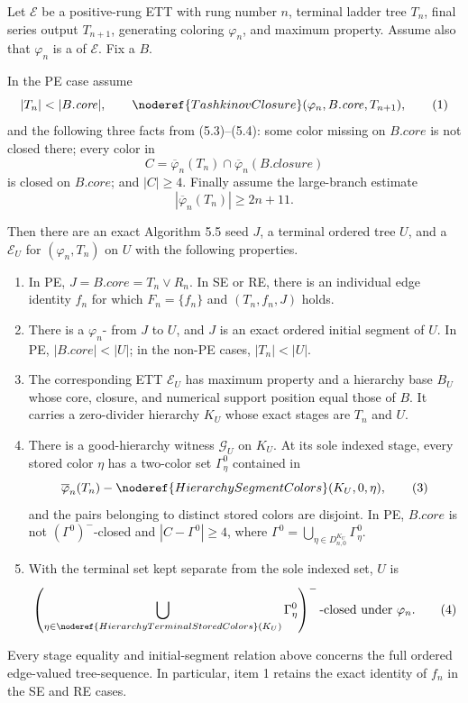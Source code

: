 \begin{theorem}
Let $\mathcal E$ be a positive-rung ETT with rung number $n$, terminal
ladder tree $T_n$, final series output $T_{n+1}$, generating coloring
$\varphi_n$, and maximum property.  Assume also that $\varphi_n$ is a
 of $\mathcal E$.  Fix a
 $B$.

In the PE case assume
\[
 |T_n|<|B.\mathit{core}|,
 \qquad
 \noderef{TashkinovClosure}
   (\varphi_n,B.\mathit{core},T_{n+1}),                         \tag{1}
\]
and the following three facts from (5.3)--(5.4): some color missing on
$B.\mathit{core}$ is not closed there; every color in
\[
 C=\overline\varphi_n(T_n)\cap
   \overline\varphi_n(B.\mathit{closure})
\]
is closed on $B.\mathit{core}$; and $|C|\geq4$.  Finally assume the
large-branch estimate
\[
                    |\overline\varphi_n(T_n)|\geq2n+11.       \tag{2}
\]

Then there are an exact Algorithm 5.5 seed $J$, a terminal ordered tree
$U$, and a  $\mathcal E_U$
for $(\varphi_n,T_n)$ on $U$ with the following properties.
\begin{enumerate}
\item In PE, $J=B.\mathit{core}=T_n\vee R_n$.  In SE or RE, there is an
  individual edge identity $f_n$ for which $F_n=\{f_n\}$ and
  $(T_n,f_n,J)$ holds.
\item There is a $\varphi_n$-
  from $J$ to $U$, and $J$ is an exact ordered initial segment of $U$.
  In PE, $|B.\mathit{core}|<|U|$; in the non-PE cases, $|T_n|<|U|$.
\item The corresponding ETT $\mathcal E_U$ has maximum property and a
  hierarchy base $B_U$ whose core, closure, and numerical support position
  equal those of $B$.  It carries a zero-divider hierarchy $K_U$ whose
  exact stages are $T_n$ and $U$.
\item There is a good-hierarchy witness $\mathcal G_U$ on $K_U$.  At its
  sole indexed stage, every stored color $\eta$ has a two-color set
  $\Gamma^0_\eta$ contained in
  \[
   \overline\varphi_n(T_n)-
     \noderef{HierarchySegmentColors}(K_U,0,\eta),             \tag{3}
  \]
  and the pairs belonging to distinct stored colors are disjoint.  In PE,
  $B.\mathit{core}$ is not $(\Gamma^0)^-$-closed and
  $|C-\Gamma^0|\geq4$, where
  $\Gamma^0=\bigcup_{\eta\in D^{K_U}_{n,0}}\Gamma^0_\eta$.
\item With the terminal set kept separate from the sole indexed set,
  $U$ is
  \[
   \left(\bigcup_{\eta\in
      \noderef{HierarchyTerminalStoredColors}(K_U)}
      \Gamma^0_\eta\right)^-
  \text{-closed under }\varphi_n.                              \tag{4}
  \]
\end{enumerate}
Every stage equality and initial-segment relation above concerns the full
ordered edge-valued tree-sequence.  In particular, item 1 retains the exact
identity of $f_n$ in the SE and RE cases.
\end{theorem}
